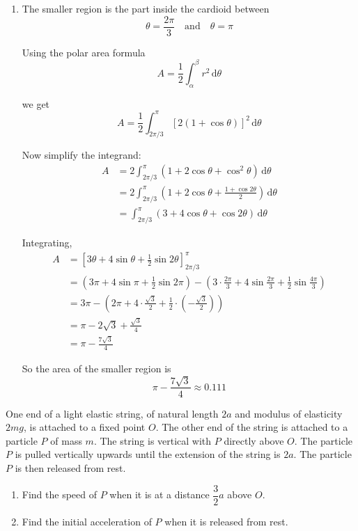 \documentclass[leqno]{article}
\begin{document}
\begin{enumerate}[
  label=\textbf{\arabic*.},
  leftmargin=*,
  topsep=0pt,
  partopsep=0pt,
  parsep=0pt
]
\begin{djsSolution}
\begin{enumerate}[label=\textbf{(\alph*)}]
	So the curves meet at the pole and at \(\left(1,\frac{2\pi}{3}\right)\).

	  \item The smaller region is the part inside the cardioid between
	\[
	\theta=\frac{2\pi}{3}\quad \text{and}\quad \theta=\pi
	\]
	
	Using the polar area formula
	\[
	A=\frac12\int_{\alpha}^{\beta} r^2\,\mathrm{d}\theta
	\]

	we get
	\[
	A=\frac12\int_{2\pi/3}^{\pi}\left[2(1+\cos\theta)\right]^2\,\mathrm{d}\theta
	\]
	
	Now simplify the integrand:
	\begin{align*}
	A&=2\int_{2\pi/3}^{\pi}(1+2\cos\theta+\cos^2\theta)\,\mathrm{d}\theta \\
	&=2\int_{2\pi/3}^{\pi}\left(1+2\cos\theta+\frac{1+\cos2\theta}{2}\right)\,\mathrm{d}\theta \\
	&=\int_{2\pi/3}^{\pi}(3+4\cos\theta+\cos2\theta)\,\mathrm{d}\theta
	\end{align*}
	
	Integrating,
	\begin{align*}
	A&=\left[3\theta+4\sin\theta+\frac12\sin2\theta\right]_{2\pi/3}^{\pi} \\
	&=\left(3\pi+4\sin\pi+\frac12\sin2\pi\right)
	-\left(3\cdot\frac{2\pi}{3}+4\sin\frac{2\pi}{3}+\frac12\sin\frac{4\pi}{3}\right) \\
	&=3\pi-\left(2\pi+4\cdot\frac{\sqrt3}{2}+\frac12\cdot\left(-\frac{\sqrt3}{2}\right)\right) \\
	&=\pi-2\sqrt3+\frac{\sqrt3}{4} \\
	&=\pi-\frac{7\sqrt3}{4}
	\end{align*}
	
	So the area of the smaller region is
	\[
	\pi-\frac{7\sqrt3}{4}\approx 0.111
	\]
	  \end{enumerate}
	\end{djsSolution}

\newpage

\questionitem

One end of a light elastic string, of natural length $2a$ and modulus of elasticity $2mg$, is attached to a fixed point $O$. The other end of the string is attached to a particle $P$ of mass $m$. The string is vertical with $P$ directly above $O$. The particle $P$ is pulled vertically upwards until the extension of the string is $2a$. The particle $P$ is then released from rest. \\
\begin{enumerate}[label=\textbf{(\alph*)}]
  \item Find the speed of $P$ when it is at a distance $\dfrac{3}{2}a$ above $O$.  \\
  \item Find the initial acceleration of $P$ when it is released from rest.  \\
\end{enumerate}


\end{enumerate}
\end{document}
